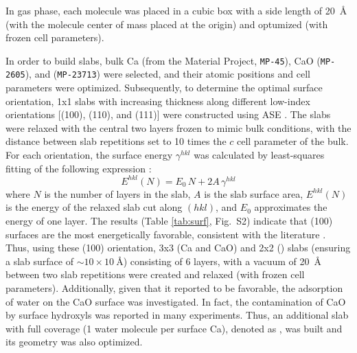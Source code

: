 \documentclass[journal=jpccck,manuscript=article]{achemso}
\begin{document}
In gas phase, each molecule was placed in a cubic box with a side length of \SI{20}{\angstrom} (with the molecule center of mass placed at the origin) and optumized (with frozen cell parameters).

In order to build slabs, bulk Ca (from the Material Project, \texttt{MP-45}), CaO (\texttt{MP-2605}), and  (\texttt{MP-23713}) were selected, and their atomic positions and cell parameters were optimized. Subsequently, to determine the optimal surface orientation, 1x1 slabs with increasing thickness along different low-index orientations [(100), (110), and (111)] were constructed using ASE \cite{larsenAtomicSimulationEnvironment2017}. The slabs were relaxed with the central two layers frozen to mimic bulk conditions, with the distance between slab repetitions set to 10 times the $c$ cell parameter of the bulk. For each orientation, the surface energy $\gamma^{hkl}$ was calculated by least-squares fitting of the following expression \cite{sunEfficientCreationConvergence2013,tranSurfaceEnergiesElemental2016}:
\begin{equation}
	E^{hkl}(N) = E_0\,N + 2A\,\gamma^{hkl} \label{eq:surf}
\end{equation}
where $N$ is the number of layers in the slab, $A$ is the slab surface area, $E^{hkl}(N)$ is the energy of the relaxed slab cut along $(hkl)$, and $E_0$ approximates the energy of one layer. The results (Table \ref{tab:surf}, Fig.~S2) indicate that (100) surfaces are the most energetically favorable, consistent with the literature \cite{deleeuwDensityFunctionalTheory2000,ebadiInsightsLiMetalOrganic2019}. 
Thus, using these (100) orientation, 3x3 (Ca and CaO) and 2x2 () slabs (ensuring a slab surface of $\sim 10\times \SI{10}{\angstrom}$) consisting of 6 layers, with a vacuum of \SI{20}{\angstrom} between two slab repetitions were created and relaxed (with frozen cell parameters). Additionally, given that it reported to be favorable\cite{deleeuwDensityFunctionalTheory2000,fujimoriInteractionWaterCaO2016a}, the adsorption of water on the CaO surface was investigated. In fact, the contamination of CaO by surface hydroxyls was reported in many experiments\cite{dupinSystematicXPSStudies2000,bebenseeAdsorptionOxygenWater2008,fujimoriInteractionWaterCaO2016a,cristXPSLibraryWebsite2021a}. Thus, an additional slab with full coverage (1 water molecule per surface Ca), denoted as , was built and its geometry was also optimized. 
\end{document}
